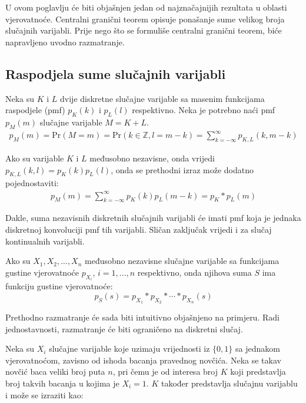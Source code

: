 U ovom poglavlju će biti objašnjen jedan od najznačajnijih rezultata u oblasti
vjerovatnoće. Centralni granični teorem opisuje ponašanje sume velikog broja
slučajnih varijabli. Prije nego što se formuliše centralni granični teorem, biće
napravljeno uvodno razmatranje.

\subsection{Raspodjela sume slučajnih varijabli}

Neka su $K$ i $L$ dvije diskretne slučajne varijable sa masenim funkcijama
raspodjele (pmf) $p_K(k)$ i $p_L(l)$ respektivno. Neka je potrebno naći pmf
$p_M(m)$ slučajne varijable $M=K+L$.
%
\newcommand{\pr}{\text{Pr}}
\begin{align*}
  p_M(m) = \pr(M=m) = \pr(k\in\mathbb{Z}, l=m-k)
  = \sum_{k=-\infty}^{\infty} p_{K,L}(k,m-k)
\end{align*}

Ako su varijable $K$ i $L$ međusobno nezavisne, onda vrijedi $p_{K,L}(k,l) =
p_K(k)p_L(l)$, onda se prethodni izraz može dodatno pojednostaviti:
%
\begin{align*}
  p_M(m) = \sum_{k=-\infty}^{\infty} p_K(k)p_L(m-k) = p_K * p_L (m)
\end{align*}

Dakle, suma nezavisnih diskretnih slučajnih varijabli će imati pmf koja je
jednaka diskretnoj konvoluciji pmf tih varijabli. Sličan zaključak vrijedi i za
slučaj kontinualnih varijabli.

\begin{theorem} %

  Ako su $X_1,X_2,...,X_n$ međusobno nezavisne slučajne varijable sa funkcijama
  gustine vjerovatnoće $p_{X_i}$, $i=1,...,n$ respektivno, onda njihova suma $S$
  ima funkciju gustine vjerovatnoće:
  $$p_S(s) = p_{X_1} * p_{X_2} * \cdots * p_{X_n} (s)$$

\end{theorem}

Prethodno razmatranje će sada biti intuitivno objašnjeno na primjeru.  Radi
jednostavnosti, razmatranje će biti ograničeno na diskretni slučaj.

Neka su $X_i$ slučajne varijable koje uzimaju vrijednosti iz $\{0,1\}$ sa
jednakom vjerovatnoćom, zavisno od ishoda bacanja pravednog novčića. Neka se
takav novčić baca veliki broj puta $n$, pri čemu je od interesa broj $K$ koji
predstavlja broj takvih bacanja u kojima je $X_i=1$. $K$ također predstavlja
slučajnu varijablu i može se izraziti kao: %

